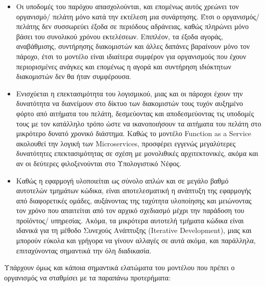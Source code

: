 \documentclass{article}
\begin{document}
\begin{itemize}
\item Οι υποδομές του παρόχου απασχολούνται, και επομένως αυτός χρεώνει τον οργανισμό/ πελάτη μόνο κατά την εκτέλεση μια συνάρτησης. Έτσι ο οργανισμός/ πελάτης δεν συσσωρεύει έξοδα σε περιόδους αδράνειας, καθώς πληρώνει μόνο βάσει του συνολικού χρόνου εκτελέσεων. Επιπλέον, τα έξοδα αγοράς, αναβάθμισης, συντήρησης διακομιστών και άλλες δαπάνες βαραίνουν μόνο τον πάροχο, έτσι το μοντέλο είναι ιδιαίτερα συμφέρον για οργανισμούς που έχουν περιορισμένες ανάγκες και επομένως η αγορά και συντήρηση ιδιόκτητων διακομιστών δεν θα ήταν συμφέρουσα.
\item Ενισχύεται η επεκτασιμότητα του λογισμικού, μιας και οι πάροχοι έχουν την δυνατότητα να διανείμουν στο δίκτυο των διακομιστών τους τυχόν αυξημένο φόρτο από αιτήματα του πελάτη, δεσμεύοντας και αποδεσμεύοντας τις υποδομές τους με τον κατάλληλο τρόπο ώστε να ικανοποιήσουν τα αιτήματα του πελάτη στο μικρότερο δυνατό χρονικό διάστημα. Καθώς το μοντέλο Function as a Service ακολουθεί την λογική των  Microservices, προσφέρει εγγενώς μεγαλύτερες δυνατότητες επεκτασιμότητας σε σχέση με μονολιθικές αρχιτεκτονικές, ακόμα και αν οι δεύτερες φιλοξενούνται στο Υπολογιστικό Νέφος.
\item Καθώς η εφαρμογή υλοποιείται ως σύνολο απλών και σε μεγάλο βαθμό αυτοτελών τμημάτων κώδικα, είναι αποτελεσματική η ανάπτυξη της εφαρμογής από διαφορετικές ομάδες, αυξάνοντας της ταχύτητα υλοποίησης και μειώνοντας τον χρόνο που απαιτείται από τον αρχικό σχεδιασμό μέχρι την παράδοση του προϊόντος/ υπηρεσίας. Ακόμα, τα μικρότερα αυτοτελή τμήματα κώδικα είναι ιδανικά για τη μέθοδο Συνεχούς Ανάπτυξης (Iterative Development), μιας και μπορούν εύκολα και γρήγορα να γίνουν αλλαγές σε αυτά ακόμα, και παράλληλα, επιταχύνοντας σημαντικά την όλη διαδικασία.
\end{itemize}

Υπάρχουν όμως και κάποια σημαντικά ελατώματα του μοντέλου που πρέπει ο οργανισμός να σταθμίσει με τα παραπάνω προτερήματα:
\end{document}
